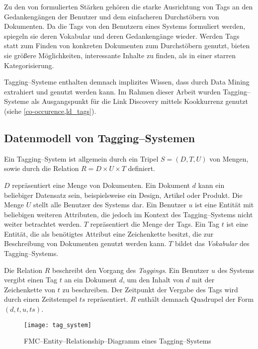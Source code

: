 Zu den von \textcite{ma2004} formulierten Stärken gehören die starke Ausrichtung von Tags an den Gedankengängen der Benutzer und dem einfacheren Durchstöbern von Dokumenten. Da die Tags von den Benutzern eines Systems formuliert werden, spiegeln sie deren Vokabular und deren Gedankengänge wieder. Werden Tags statt zum Finden von konkreten Dokumenten zum Durchstöbern genutzt, bieten sie größere Möglichkeiten, interessante Inhalte zu finden, als in einer starren Kategorisierung.

Tagging--Systeme enthalten demnach implizites Wissen, dass durch Data Mining extrahiert und genutzt werden kann. Im Rahmen dieser Arbeit wurden Tagging--Systeme als Ausgangspunkt für die Link Discovery mittels Kookkurrenz genutzt (siehe \cref{co-occurence,ld_tags}).

\subsection{Datenmodell von Tagging--Systemen}
\label{tagging_data}

Ein Tagging--System ist allgemein durch ein Tripel \(S=(D, T, U)\) von Mengen, sowie durch die Relation \(R = D \times U \times T\) definiert. 

\(D\) repräsentiert eine Menge von Dokumenten. Ein Dokument \(d\) kann ein beliebiger Datensatz sein, beispielsweise ein Design, Artikel oder Produkt. Die Menge \(U\) stellt alle Benutzer des Systems dar. Ein Benutzer \(u\) ist eine Entität mit beliebigen weiteren Attributen, die jedoch im Kontext des Tagging--Systems nicht weiter betrachtet werden. \(T\) repräsentiert die Menge der Tags. Ein Tag \(t\) ist eine Entität, die als benötigtes Attribut eine Zeichenkette besitzt, die zur Beschreibung von Dokumenten genutzt werden kann. \(T\) bildet das \emph{Vokabular} des Tagging--Systems.

Die Relation \(R\) beschreibt den Vorgang des \emph{Taggings}. Ein Benutzer \(u\) des Systems vergibt einen Tag \(t\) an ein Dokument \(d\), um den Inhalt von \(d\) mit der Zeichenkette von \(t\) zu beschreiben. Der Zeitpunkt der Vergabe des Tags wird durch einen Zeitstempel \(ts\) repräsentiert. \(R\) enthält demnach Quadrupel der Form \((d,t,u,ts)\).

\begin{figure}
\centering
\texttt{[image: tag\_system]}
\caption{FMC--Entity--Relationship--Diagramm eines Tagging--Systems}
\label{fig:tagging_erd}
\end{figure}

